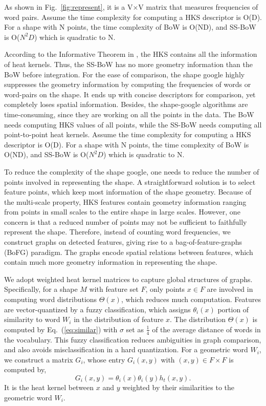 As shown in Fig.~\ref{fig:represent}, it is a V$\times$V matrix that measures frequencies of word pairs. Assume the time complexity for computing a HKS descriptor is O(D). For a shape with N points, the time complexity of BoW is O(ND), and SS-BoW is O($N^2 D$) which is quadratic to N.

According to the Informative Theorem in \cite{Sun:2009:CGF}, the HKS contains all the information of heat kernels. Thus, the SS-BoW has no more geometry information than the BoW before integration. For the ease of comparison, the shape google highly suppresses the geometry information by computing the frequencies of words or word-pairs on the shape. It ends up with concise descriptors for comparison, yet completely loses spatial information. Besides, the shape-google algorithms are time-consuming, since they are working on all the points in the data. The BoW needs computing HKS values of all points, while the SS-BoW needs computing all point-to-point heat kernels. Assume the time complexity for computing a HKS descriptor is O(D). For a shape with N points, the time complexity of BoW is O(ND), and SS-BoW is O($N^2 D$) which is quadratic to N.

To reduce the complexity of the shape google, one needs to reduce the number of points involved in representing the shape. A straightforward solution is to select feature points, which keep most information of the shape geometry. Because of the multi-scale property, HKS features contain geometry information ranging from points in small scales to the entire shape in large scales. However, one concern is that a reduced number of points may not be sufficient to faithfully represent the shape. Therefore, instead of counting word frequencies, we construct graphs on detected features, giving rise to a bag-of-feature-graphs (BoFG) paradigm. The graphs encode spatial relations between features, which contain much more geometry information in representing the shape.

We adopt weighted heat kernel matrices to capture global structures of graphs. Specifically, for a shape $M$ with feature set $F$, only points $x\in F$ are involved in computing word distributions $\Theta(x)$, which reduces much computation. Features are vector-quantized by a fuzzy classification, which assigns $\theta_i(x)$ portion of similarity to word $W_i$ in the distribution of feature $x$. The distribution $\Theta(x)$ is computed by Eq.~(\ref{eq:similar}) with $\sigma$ set as $\frac{1}{4}$ of the average distance of words in the vocabulary. This fuzzy classification reduces ambiguities in graph comparison, and also avoids misclassification in a hard quantization. For a geometric word $W_i$, we construct a matrix $G_i$, whose entry $G_i(x,y)$ with $(x,y)\in F\times F$ is computed by,
\begin{equation}
G_i(x,y)=\theta_i(x)\theta_i(y)h_t(x,y).
\end{equation}
It is the heat kernel between $x$ and $y$ weighted by their similarities to the geometric word $W_i$.

